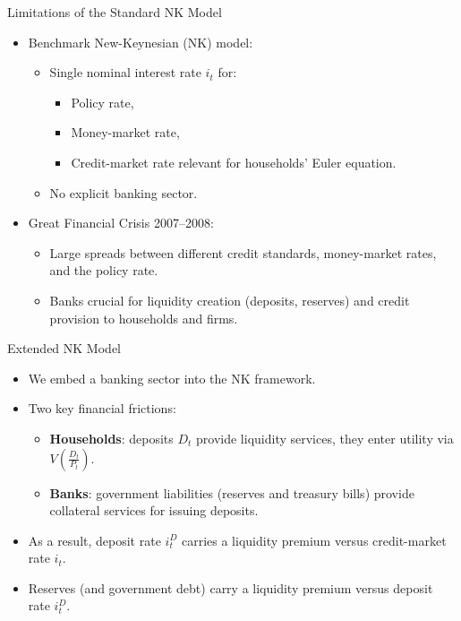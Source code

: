 \documentclass[11pt,aspectratio=169]{beamer}
\begin{document}
\begin{frame}{Limitations of the Standard NK Model}
  \begin{itemize}
    \item Benchmark New-Keynesian (NK) model:
    \begin{itemize}
      \item Single nominal interest rate $i_t$ for:
      \begin{itemize}
        \item Policy rate,
        \item Money-market rate,
        \item Credit-market rate relevant for households' Euler equation.
      \end{itemize}
      \item No explicit banking sector.
    \end{itemize}
    \medskip
    \item Great Financial Crisis 2007--2008:
    \begin{itemize}
      \item Large spreads between different credit standards, money-market rates, and the policy rate.
      \item Banks crucial for liquidity creation (deposits, reserves) and credit provision to households and firms.
    \end{itemize}
  \end{itemize}
\end{frame}

\begin{frame}{Extended NK Model}
  \begin{itemize}
    \item We embed a banking sector into the NK framework.
    \medskip
    \item Two key financial frictions:
    \begin{itemize}

      \item \textbf{Households}: deposits $D_t$ provide liquidity services, they enter utility via $V(\frac{D_t}{P_t})$.
      \item \textbf{Banks}: government liabilities (reserves and treasury bills) provide collateral services for issuing deposits.
    \end{itemize}
    \medskip
    \item As a result, deposit rate $i_t^D$ carries a liquidity premium versus credit-market rate $i_t$. \item Reserves (and government debt) carry a liquidity premium versus deposit rate $i_t^D$.
    \end{itemize}
\end{frame}
\end{document}
